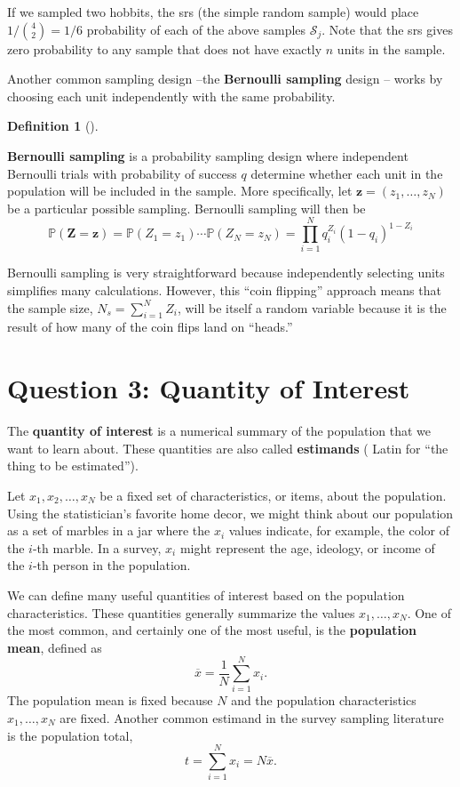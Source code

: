 \documentclass[
  letterpaper,
  DIV=11,
  numbers=noendperiod]{scrreprt}
\newcommand{\mb}{\symbf}
\renewcommand{\P}{\mathbb{P}}
\theoremstyle{definition}
\theoremstyle{definition}
\newtheorem{definition}{Definition}[chapter]
\theoremstyle{plain}
\theoremstyle{remark}
\begin{document}
If we sampled two hobbits, the srs (the simple random sample) would
place \(1/{4\choose 2} = 1/6\) probability of each of the above samples
\(\mathcal{S}_j\). Note that the srs gives zero probability to any
sample that does not have exactly \(n\) units in the sample.

Another common sampling design --the \textbf{Bernoulli sampling} design
-- works by choosing each unit independently with the same probability.

\begin{definition}[]\protect\hypertarget{def-srs}{}\label{def-srs}

\textbf{Bernoulli sampling} is a probability sampling design where
independent Bernoulli trials with probability of success \(q\) determine
whether each unit in the population will be included in the sample. More
specifically, let \(\mb{z} = (z_{1}, \ldots, z_{N})\) be a particular
possible sampling. Bernoulli sampling will then be \[
\P(\mb{Z} = \mb{z}) = \P(Z_1 = z_1) \cdots \P(Z_N = z_N) = \prod_{i=1}^N q_i^{Z_i}(1 - q_i)^{1-Z_i}
\]

\end{definition}

Bernoulli sampling is very straightforward because independently
selecting units simplifies many calculations. However, this ``coin
flipping'' approach means that the sample size,
\(N_s = \sum_{i=1}^N Z_i\), will be itself a random variable because it
is the result of how many of the coin flips land on ``heads.''

\hypertarget{question-3-quantity-of-interest}{%
\section{Question 3: Quantity of
Interest}\label{question-3-quantity-of-interest}}

The \textbf{quantity of interest} is a numerical summary of the
population that we want to learn about. These quantities are also called
\textbf{estimands} ( Latin for ``the thing to be estimated'').

Let \(x_1, x_2, \ldots, x_N\) be a fixed set of characteristics, or
items, about the population. Using the statistician's favorite home
decor, we might think about our population as a set of marbles in a jar
where the \(x_i\) values indicate, for example, the color of the
\(i\)-th marble. In a survey, \(x_i\) might represent the age, ideology,
or income of the \(i\)-th person in the population.

We can define many useful quantities of interest based on the population
characteristics. These quantities generally summarize the values
\(x_1, \ldots, x_N\). One of the most common, and certainly one of the
most useful, is the \textbf{population mean}, defined as \[
\overline{x} = \frac{1}{N} \sum_{i=1}^N x_i.
\] The population mean is fixed because \(N\) and the population
characteristics \(x_1, \ldots, x_N\) are fixed. Another common estimand
in the survey sampling literature is the population total, \[
t = \sum_{i=1}^N x_i = N\overline{x}.
\]
\end{document}
